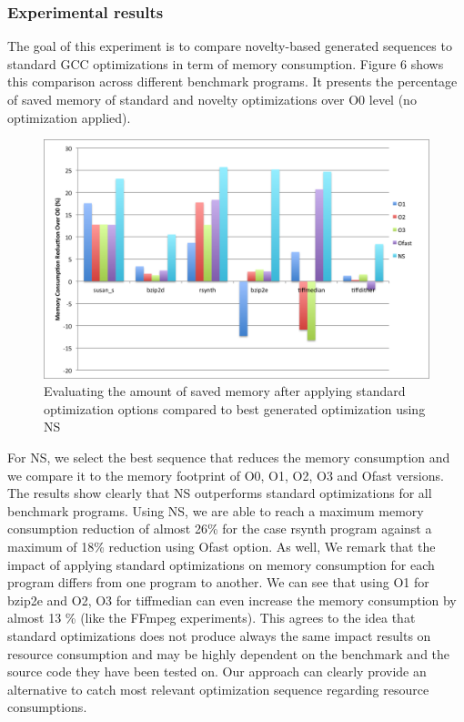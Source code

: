 \subsubsection{Experimental results}

The goal of this experiment is to compare novelty-based generated sequences to standard GCC optimizations in term of memory consumption. Figure 6 shows this comparison across different benchmark programs. It presents the percentage of saved memory of standard and novelty optimizations over O0 level (no optimization applied).
 
\begin{figure}[!ht]
	\centering
	\includegraphics[width=1.\linewidth]{Ressources/infra_novelty_stat3.png}
	\caption{Evaluating the amount of saved memory after applying standard optimization options compared to best generated optimization using NS}
\end{figure}

For NS, we select the best sequence that reduces the memory consumption and we compare it to the memory footprint of O0, O1, O2, O3 and Ofast versions. The results show clearly that NS outperforms standard optimizations for all benchmark programs. Using NS, we are able to reach a maximum memory consumption reduction of almost 26\% for the case rsynth program against a maximum of 18\% reduction using Ofast option. As well, We remark that the impact of applying standard optimizations on memory consumption for each program differs from one program to another. We can see that using O1 for bzip2e and O2, O3 for tiffmedian can even increase the memory consumption by almost 13 \% (like the FFmpeg experiments). This agrees to the idea that standard optimizations does not produce always the same impact results on resource consumption and may be highly dependent on the benchmark and the source code they have been tested on. Our approach can clearly provide an alternative to catch most relevant optimization sequence regarding resource consumptions.

